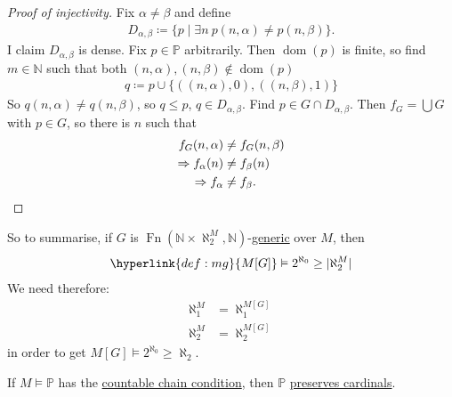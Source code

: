 \documentclass{article}
\newcommand{\named}[1]{\textbf{#1}\index{#1}}
\newcommand{\p}{\mathbb{P}}
\newcommand{\1}{\mathbbm{1}}
\DeclareMathOperator{\dom}{dom}
\let\models\vDash
\begin{document}
\begin{proof}[Proof of injectivity]
  Fix $\alpha \neq \beta$ and define
  \begin{align*}
    D_{\alpha,\beta} \coloneqq \{p \mid \exists n \ p(n,\alpha) \neq p(n,\beta)\}.
  \end{align*}
  I claim $D_{\alpha,\beta}$ is dense. Fix $p \in \p$ arbitrarily. Then $\dom(p)$ is finite, so find $m \in \mathbb{N}$ such that both $(n,\alpha), (n,\beta) \notin \dom(p)$
  \begin{align*}
    q \coloneqq p \cup \{((n,\alpha), 0), ((n,\beta),1)\}
  \end{align*}
  So $q(n,\alpha) \neq q(n,\beta)$, so $q \leq p$, $q \in D_{\alpha,\beta}$.
  Find $p \in G \cap D_{\alpha,\beta}$. Then $f_G = \bigcup G$ with $p \in G$, so there is $n$ such that
  \begin{align*}
    f_G(n,\alpha) &\neq f_G(n,\beta) \\
    \Rightarrow f_\alpha(n) &\neq f_\beta(n) \\
    \Rightarrow f_\alpha &\neq f_\beta. \qedhere
  \end{align*}
\end{proof}
So to summarise, if $G$ is $\operatorname{Fn}(\mathbb{N} \times \aleph_2^M, \mathbb{N})$-\hyperlink{def:genericO}{generic} over $M$, then
\begin{align*}
  \hyperlink{def:mg}{M[G]} \models 2^{\aleph_0} \geq |\aleph_2^M|
\end{align*}
We need therefore:
\begin{align*}
  \aleph_1^M &= \aleph_1^{M[G]} \\
  \aleph_2^M &= \aleph_2^{M[G]}
\end{align*}
in order to get $M[G] \models 2^{\aleph_0} \geq \aleph_2$.

\begin{thm}
  If $M \models \p$ has the \hyperlink{def:ccc}{countable chain condition}, then $\p$ \hyperlink{def:pcard}{preserves cardinals}.
\end{thm}
\end{document}
